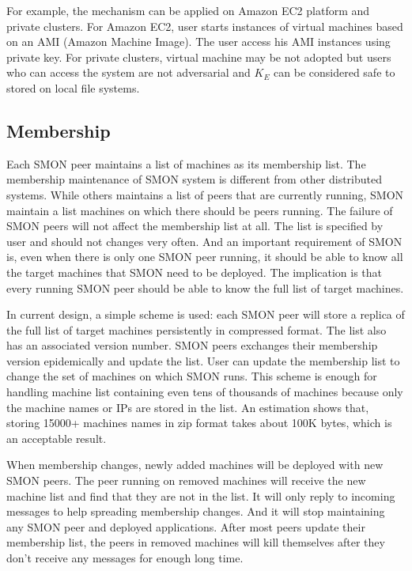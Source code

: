 For example, the mechanism can be applied on Amazon EC2
platform and private clusters. For Amazon EC2, user starts
instances of virtual machines based on an AMI (Amazon
Machine Image). The user access his AMI instances using
private key. For private clusters, virtual machine may be not
adopted but users who can access the system are not
adversarial and $K_E$ can be considered safe to stored on
local file systems.

\subsection{Membership}

Each SMON peer maintains a list of machines as its
membership list.  The membership maintenance of SMON system
is different from other distributed systems. While others
maintains a list of peers that are currently running, SMON
maintain a list machines on which there should be peers
running. The failure of SMON peers will not affect the
membership list at all. The list is specified by user and
should not changes very often. And an important requirement
of SMON is, even when there is only one SMON peer running,
it should be able to know all the target machines that SMON
need to be deployed.  The implication is that every running
SMON peer should be able to know the full list of target
machines.

In current design, a simple scheme is used: each SMON peer
will store a replica of the full list of target machines
persistently in compressed format. The list also has an
associated version number. SMON peers exchanges their
membership version epidemically and update the list. User
can update the membership list to change the set of machines
on which SMON runs.
This scheme is enough for handling machine list containing
even tens of thousands of machines because only the machine
names or IPs are stored in the list.  An estimation shows
that, storing 15000+ machines names in zip format takes
about 100K bytes, which is an acceptable result.

When membership changes, newly added machines will be
deployed with new SMON peers. The peer running on removed
machines will receive the new machine list and find that
they are not in the list. It will only reply to incoming
messages to help spreading membership changes. And it will
stop maintaining any SMON peer and deployed applications.
After most peers update their membership list, the peers in
removed machines will kill themselves after they don't
receive any messages for enough long time.

